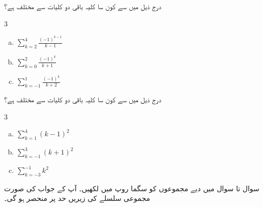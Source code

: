درج ذیل میں سے کون سا کلیہ باقی دو کلیات سے مختلف ہے؟
\begin{multicols}{3}
\begin{enumerate}[a.]
\item
$\sum\limits_{k=2}^4 \tfrac{(-1)^{k-1}}{k-1}$
\item
$\sum\limits_{k=0}^2 \tfrac{(-1)^k}{k+1}$
\item
$\sum\limits_{k=-1}^1 \tfrac{(-1)^k}{k+2}$
\end{enumerate}
\end{multicols}
درج ذیل میں سے کون سا کلیہ باقی دو کلیات سے مختلف ہے؟
\begin{multicols}{3}
\begin{enumerate}[a.]
\item
$\sum\limits_{k=1}^4 (k-1)^2$
\item
$\sum\limits_{k=-1}^3 (k+1)^2$
\item
$\sum\limits_{k=-3}^{-1} k^2$
\end{enumerate}
\end{multicols}
سوال  تا سوال  میں دیے مجموعوں کو سگما روپ میں لکھیں۔ آپ کے جواب کی صورت مجموعی سلسلے کی زیریں حد پر منحصر ہو گی۔ 

